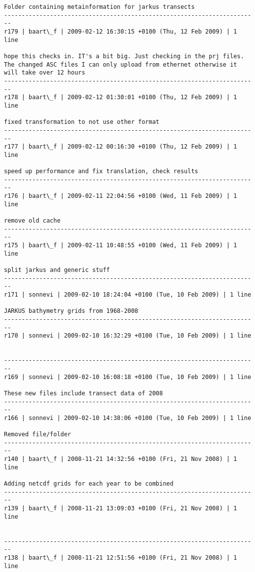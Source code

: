 \documentclass[9]{report}
\begin{document}
\begin{description}
\begin{verbatim}
Folder containing metainformation for jarkus transects
------------------------------------------------------------------------
r179 | baart\_f | 2009-02-12 16:30:15 +0100 (Thu, 12 Feb 2009) | 1 line

hope this checks in. IT's a bit big. Just checking in the prj files. The changed ASC files I can only upload from ethernet otherwise it will take over 12 hours
------------------------------------------------------------------------
r178 | baart\_f | 2009-02-12 01:30:01 +0100 (Thu, 12 Feb 2009) | 1 line

fixed transformation to not use other format
------------------------------------------------------------------------
r177 | baart\_f | 2009-02-12 00:16:30 +0100 (Thu, 12 Feb 2009) | 1 line

speed up performance and fix translation, check results
------------------------------------------------------------------------
r176 | baart\_f | 2009-02-11 22:04:56 +0100 (Wed, 11 Feb 2009) | 1 line

remove old cache
------------------------------------------------------------------------
r175 | baart\_f | 2009-02-11 10:48:55 +0100 (Wed, 11 Feb 2009) | 1 line

split jarkus and generic stuff
------------------------------------------------------------------------
r171 | sonnevi | 2009-02-10 18:24:04 +0100 (Tue, 10 Feb 2009) | 1 line

JARKUS bathymetry grids from 1968-2008
------------------------------------------------------------------------
r170 | sonnevi | 2009-02-10 16:32:29 +0100 (Tue, 10 Feb 2009) | 1 line


------------------------------------------------------------------------
r169 | sonnevi | 2009-02-10 16:08:18 +0100 (Tue, 10 Feb 2009) | 1 line

These new files include transect data of 2008
------------------------------------------------------------------------
r166 | sonnevi | 2009-02-10 14:38:06 +0100 (Tue, 10 Feb 2009) | 1 line

Removed file/folder
------------------------------------------------------------------------
r140 | baart\_f | 2008-11-21 14:32:56 +0100 (Fri, 21 Nov 2008) | 1 line

Adding netcdf grids for each year to be combined
------------------------------------------------------------------------
r139 | baart\_f | 2008-11-21 13:09:03 +0100 (Fri, 21 Nov 2008) | 1 line


------------------------------------------------------------------------
r138 | baart\_f | 2008-11-21 12:51:56 +0100 (Fri, 21 Nov 2008) | 1 line


\end{verbatim}
\end{description}
\end{document}
